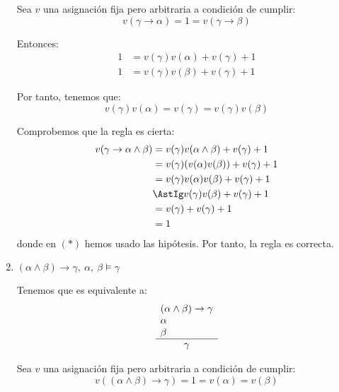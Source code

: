 \begin{ejercicio*}
\begin{enumerate}
        Sea $v$ una asignación fija pero arbitraria a condición de cumplir:
        \begin{equation*}
            v(\gamma\rightarrow\alpha)=1=v(\gamma\rightarrow\beta)
        \end{equation*}

        Entonces:
        \begin{align*}
            1 &= v(\gamma)v(\alpha)+v(\gamma)+1\\
            1 &= v(\gamma)v(\beta)+v(\gamma)+1
        \end{align*}

        Por tanto, tenemos que:
        \begin{equation*}
            v(\gamma)v(\alpha) = v(\gamma) = v(\gamma)v(\beta)
        \end{equation*}

        Comprobemos que la regla es cierta:
        \begin{align*}
            v(\gamma\rightarrow\alpha\land\beta) &= v(\gamma)v(\alpha\land\beta)+v(\gamma)+1\\
            &= v(\gamma)(v(\alpha)v(\beta))+v(\gamma)+1\\
            &= v(\gamma)v(\alpha)v(\beta)+v(\gamma)+1\\
            &\AstIg v(\gamma)v(\beta)+v(\gamma)+1\\
            &= v(\gamma)+v(\gamma)+1\\
            &= 1
        \end{align*}
        donde en $(\ast)$ hemos usado las hipótesis.
        Por tanto, la regla es correcta.

        \item $(\alpha\land\beta)\rightarrow\gamma,~\alpha,~\beta \models \gamma$

        Tenemos que es equivalente a:
        \begin{equation*}
            \begin{array}{l}
                (\alpha\land\beta)\rightarrow\gamma\\
                \alpha\\
                \beta\\ \hline
                \multicolumn{1}{c}{\gamma}
            \end{array}
        \end{equation*}

        Sea $v$ una asignación fija pero arbitraria a condición de cumplir:
        \begin{equation*}
            v((\alpha\land\beta)\rightarrow\gamma)=1=v(\alpha)=v(\beta)
        \end{equation*}


\end{enumerate}
\end{ejercicio*}
